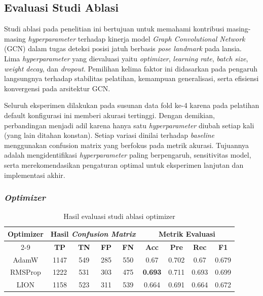 \subsection{Evaluasi Studi Ablasi} \label{IV.evaluasi-ablasi}
Studi ablasi pada penelitian ini bertujuan untuk memahami kontribusi masing-masing \textit{hyperparameter} terhadap kinerja model \textit{Graph Convolutional Network} (GCN) dalam tugas deteksi posisi jatuh berbasis \textit{pose landmark} pada lansia. Lima \textit{hyperparameter} yang dievaluasi yaitu \textit{optimizer}, \textit{learning rate}, \textit{batch size}, \textit{weight decay}, dan \textit{dropout}. Pemilihan kelima faktor ini didasarkan pada pengaruh langsungnya terhadap stabilitas pelatihan, kemampuan generalisasi, serta efisiensi konvergensi pada arsitektur GCN. \par

Seluruh eksperimen dilakukan pada susunan data fold ke-4 karena pada pelatihan default konfigurasi ini memberi akurasi tertinggi. Dengan demikian, perbandingan menjadi adil karena hanya satu \textit{hyperparameter} diubah setiap kali (yang lain ditahan konstan). Setiap variasi dinilai terhadap \textit{baseline} menggunakan confusion matrix yang berfokus pada metrik akurasi. Tujuannya adalah mengidentifikasi \textit{hyperparameter} paling berpengaruh, sensitivitas model, serta merekomendasikan pengaturan optimal untuk eksperimen lanjutan dan implementasi akhir. \par

\subsubsection{\textit{Optimizer}} \label{IV.optimizer}
\begin{table}[htbp]
    \centering
    \caption{Hasil evaluasi studi ablasi optimizer}
    \label{tab:ablasi optimizer}
    \begin{tabular}{|c|c|c|c|c|c|c|c|c|}
        \hline
        \multirow{2}{*}{\textbf{Optimizer}} & \multicolumn{4}{c|}{\textbf{Hasil \textit{Confusion Matrix}}} & \multicolumn{4}{c|}{\textbf{Metrik Evaluasi}} \\ \cline{2-9}
         & \textbf{TP} & \textbf{TN} & \textbf{FP} & \textbf{FN} & \textbf{Acc} & \textbf{Pre} & \textbf{Rec} & \textbf{F1} \\ \hline
        AdamW & 1147 & 549 & 285 & 550 & 0.67 & 0.702 & 0.67 & 0.679 \\ \hline
        RMSProp & 1222  & 531 & 303 & 475 & \textbf{0.693} & 0.711 & 0.693 & 0.699 \\ \hline
        LION & 1158 & 523 & 311 & 539 & 0.664 & 0.691 & 0.664 & 0.672 \\ \hline
    \end{tabular}
\end{table}

